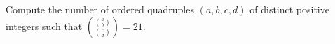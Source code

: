 Compute the number of ordered quadruples $(a,b,c,d)$ of distinct positive integers such that $\displaystyle \binom{\binom{a}{b}}{\binom{c}{d}}=21$.

